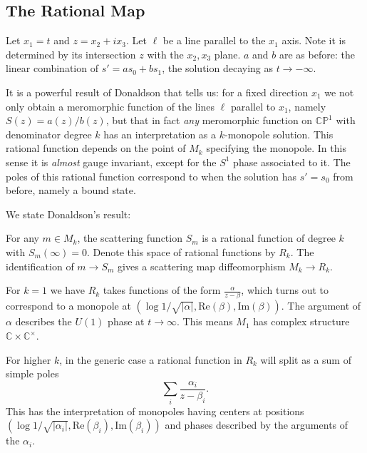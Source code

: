 	
	\subsection{The Rational Map}
	Let $x_1 = t$ and $z = x_2 + i x_3$. Let $\ell$ be a line parallel to the $x_1$ axis. Note it is determined by its intersection $z$ with the $x_2, x_3$ plane. $a$ and $b$ are as before: the linear combination of $s' = a s_0 + b s_1$, the solution decaying as $t \to -\infty$.
	
	It is a powerful result of Donaldson \cite{donaldson1984nahm} that tells us: for a fixed direction $x_1$ we not only obtain a meromorphic function of the lines $\ell$ parallel to $x_1$, namely $S(z) = a(z)/b(z)$, but that in fact \emph{any} meromorphic function on $\mathbb{CP}^1$ with denominator degree $k$ has an interpretation as a $k$-monopole solution. This rational function depends on the point of $M_k$ specifying the monopole. In this sense it is \emph{almost} gauge invariant, except for the $S^1$ phase associated to it. The poles of this rational function correspond to when the solution has $s' = s_0$ from before, namely a bound state. 
	
	We state Donaldson's result:
	\begin{theorem}[Donaldson]
		For any $m \in M_k$, the scattering function $S_m$ is a rational function of degree $k$ with $S_m(\infty) = 0$. Denote this space of rational functions by $R_k$. The identification of $m \to S_m$ gives a scattering map diffeomorphism $M_k \to R_k$.
	\end{theorem}

	\begin{eg}
		For $k=1$ we have $R_k$ takes functions of the form $\frac{\alpha}{z-\beta}$, which turns out to correspond to a monopole at $(\log{1/\sqrt{|\alpha|}}, \mathrm{Re}(\beta), \mathrm{Im}(\beta))$. The argument of $\alpha$ describes the $U(1)$ phase at $t \to \infty$. This means $M_1$ has complex structure $\mathbb C \times \mathbb C^\times$.
	\end{eg}
	\begin{eg}
		For higher $k$, in the generic case a rational function in $R_k$ will split as a sum of simple poles
		$$\sum_{i} \frac{\alpha_i}{z-\beta_i}.$$
		This has the interpretation of monopoles having centers at positions $(\log{1/\sqrt{|\alpha_i|}}, \mathrm{Re}(\beta_i), \mathrm{Im}(\beta_i))$ and phases described by the arguments of the $\alpha_i$.
	\end{eg}
	
	

